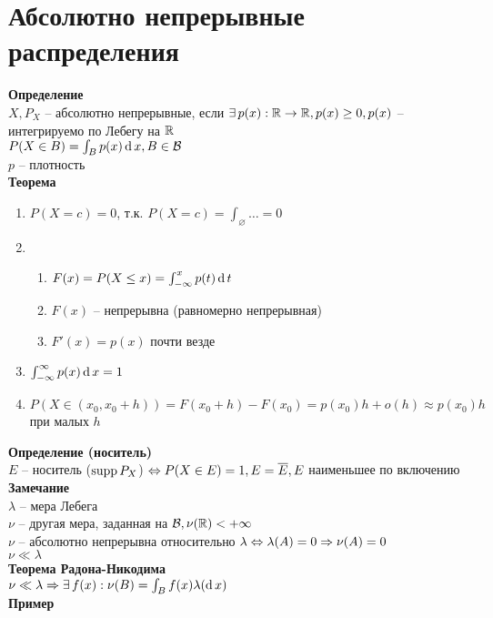 \documentclass[12pt]{article}
\begin{document}
\section{Абсолютно непрерывные распределения}
\textbf{Определение}\\
$X, P_X$ -- абсолютно непрерывные, если $\exists\, p(x): \mathbb{R} \rightarrow \mathbb{R}, p(x) \geq 0, p(x)$ -- интегрируемо по Лебегу на $\mathbb{R}$\\
$P(X \in B) = \int_B p(x)\operatorname{d} x, B \in \mathcal{B}$\\
$p$ -- плотность\\
\textbf{Теорема}
\begin{enumerate}
    \item $P(X = c) = 0$, т.к. $P(X = c) = \int_\varnothing \ldots = 0$
    \item \begin{enumerate}
        \item $F(x) = P(X \leq x) = \int_{-\infty}^x p(t) \operatorname{d} t$
        \item $F(x)$ -- непрерывна (равномерно непрерывная)
        \item $F'(x) = p(x)$ почти везде
    \end{enumerate}
    \item $\int_{-\infty}^\infty p(x)\operatorname{d} x = 1$
    \item $P(X \in (x_0, x_0 + h)) = F(x_0+h) - F(x_0) = p(x_0)h + o(h) \approx p(x_0)h$ при малых $h$
\end{enumerate}
\textbf{Определение (носитель)}\\
$E$ -- носитель ($\operatorname{supp} P_X$) $\Leftrightarrow P(X \in E) = 1, E = \overline E, E$ наименьшее по включению\\
\textbf{Замечание}\\
$\lambda$ -- мера Лебега\\
$\nu$ -- другая мера, заданная на $\mathcal{B}, \nu(\mathbb{R}) < +\infty$\\
$\nu$ -- абсолютно непрерывна относительно $\lambda \Leftrightarrow \lambda(A) = 0 \Rightarrow \nu(A) = 0$\\
$\nu\ll \lambda$\\
\textbf{Теорема Радона-Никодима}\\
$\nu \ll \lambda \Rightarrow \exists\, f(x): \nu(B) = \int_B f(x)\lambda(\operatorname{d} x)$\\
\textbf{Пример}
\end{document}
